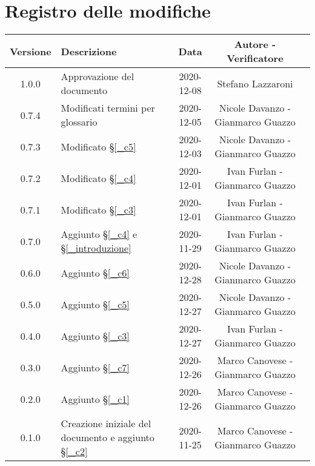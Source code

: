 \section*{Registro delle modifiche}

\begin{center}
	\begin{longtable}{|c|p{5cm}|c|c|c|}
	\hline
	\rowcolor{lighter-grayer}
	\textbf{Versione} & \textbf{Descrizione} & \textbf{Data} & \textbf{Autore - Verificatore}\\
	\hline
	\endfirsthead

	\hline
	1.0.0 & Approvazione del documento & 2020-12-08 & Stefano Lazzaroni\\
	0.7.4 & Modificati termini per glossario & 2020-12-05 & Nicole Davanzo - Gianmarco Guazzo\\
	0.7.3 & Modificato \S\ref{_c5} & 2020-12-03 & Nicole Davanzo - Gianmarco Guazzo\\
	0.7.2 & Modificato \S\ref{_c4} & 2020-12-01 & Ivan Furlan - Gianmarco Guazzo\\
	0.7.1 & Modificato \S\ref{_c3} & 2020-12-01 & Ivan Furlan - Gianmarco Guazzo\\
	0.7.0 & Aggiunto \S\ref{_c4} e \S\ref{_introduzione} & 2020-11-29 & Ivan Furlan - Gianmarco Guazzo\\
	0.6.0 & Aggiunto \S\ref{_c6} & 2020-12-28 & Nicole Davanzo - Gianmarco Guazzo\\
	0.5.0 & Aggiunto \S\ref{_c5} & 2020-12-27 & Nicole Davanzo - Gianmarco Guazzo\\
	0.4.0 & Aggiunto \S\ref{_c3} & 2020-12-27 & Ivan Furlan - Gianmarco Guazzo\\
	0.3.0 & Aggiunto \S\ref{_c7} & 2020-12-26 & Marco Canovese - Gianmarco Guazzo\\
	0.2.0 & Aggiunto \S\ref{_c1} & 2020-12-26 & Marco Canovese - Gianmarco Guazzo\\
    0.1.0 & Creazione iniziale del documento e aggiunto \S\ref{_c2} & 2020-11-25 & Marco Canovese - Gianmarco Guazzo\\
	\hline

	\end{longtable}
\end{center}
